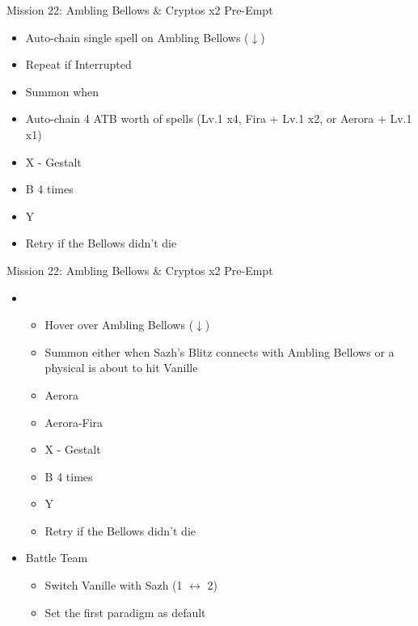 \begin{paracol}{2}
\begin{battle}{Mission 22: Ambling Bellows \& Cryptos x2 Pre-Empt}
\begin{itemize}
			      \begin{itemize}
				      \item Auto-chain single spell on Ambling Bellows ($\downarrow$)
				      \item Repeat if Interrupted
				      \item Summon when \stagger\
				      \item Auto-chain 4 ATB worth of spells (Lv.1 x4, Fira + Lv.1 x2, or Aerora + Lv.1 x1)
				      \item X - Gestalt
				      \item B 4 times
				      \item Y
				      \item Retry if the Bellows didn't die
			      \end{itemize}
		\end{itemize}
	\end{battle}
	\switchcolumn
	\begin{battle}{Mission 22: Ambling Bellows \& Cryptos x2 Pre-Empt}
		\begin{itemize}
			\item \sixth
			      \begin{itemize}
				      \item Hover over Ambling Bellows ($\downarrow$)
				      \item Summon either when Sazh's Blitz connects with Ambling Bellows or a physical is about to hit Vanille
				      \item Aerora
				      \item Aerora-Fira
				      \item X - Gestalt
				      \item B 4 times
				      \item Y
				      \item Retry if the Bellows didn't die
			      \end{itemize}
		\end{itemize}
	\end{battle}
	\switchcolumn*
	\renewcommand{\sixth}{[6] Aggression (\com/\rav/\com)}

	\begin{menu}
		\begin{itemize}
			\paradigm
			\begin{itemize}
				\item Battle Team
				      \begin{itemize}
					      \item Switch Vanille with Sazh (1 $\leftrightarrow$ 2)
					      \item Set the first paradigm as default
				      \end{itemize}
			\end{itemize}
		\end{itemize}
	\end{menu}


\end{paracol}
